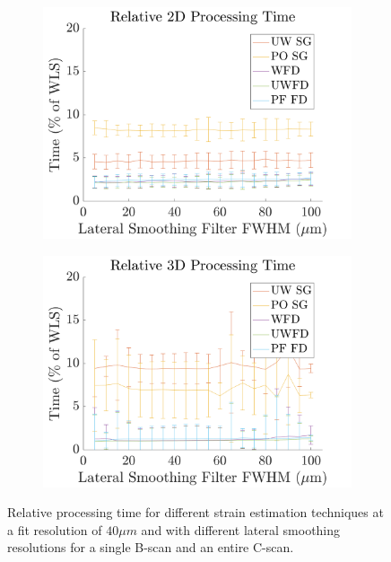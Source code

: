 \begin{figure}[b!]
	\centering
    \begin{subfigure}{0.49\textwidth}
    	\centering
        \includegraphics[width=\textwidth]{figures/2d_relative_lr.png}
    \end{subfigure}
    \begin{subfigure}{0.49\textwidth}
    	\centering
        \includegraphics[width=\textwidth]{figures/3d_relative_lr.png}
    \end{subfigure}
	\caption{Relative processing time for different strain estimation techniques at a fit resolution of $40\mu m$ and with different lateral smoothing resolutions for a single B-scan and an entire C-scan.}
    \label{process_time_2}
\end{figure}

